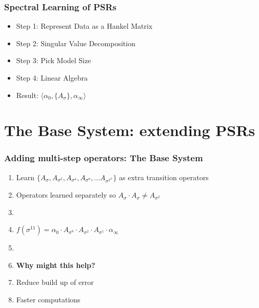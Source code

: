\documentclass{beamer}
\begin{document}

\begin{frame}
\frametitle{Spectral Learning of PSRs}

\begin{itemize}
\item[] Step 1: Represent Data as a Hankel Matrix
\item[] Step 2: Singular Value Decomposition
\item[] Step 3: Pick Model Size
\item[] Step 4: Linear Algebra
\item[] Result: $\langle \alpha_0, \{A_\sigma\},\alpha_\infty \rangle$ 
\end{itemize}

\end{frame}

\section{The Base System: extending PSRs}

\begin{frame}
\frametitle{Adding multi-step operators: The Base System}
\begin{enumerate}

\item Learn $\{A_{\sigma}, A_{\sigma^2}, A_{\sigma^4}, A_{\sigma^8}, ... A_{\sigma^{2^N}}\}$ as extra transition operators
\item[] Operators learned separately so $A_{\sigma} \cdot A_{\sigma} \neq A_{\sigma^2}$
\item[]

\item $f(\sigma^{11}) = \alpha_0 \cdot A_{\sigma^8} \cdot A_{\sigma^2} \cdot A_{\sigma^1} \cdot \alpha_\infty$
\item[]

\item \textbf{Why might this help?}
\item[] Reduce build up of error
\item[] Faster computations

\end{enumerate}
\end{frame}
\end{document}
